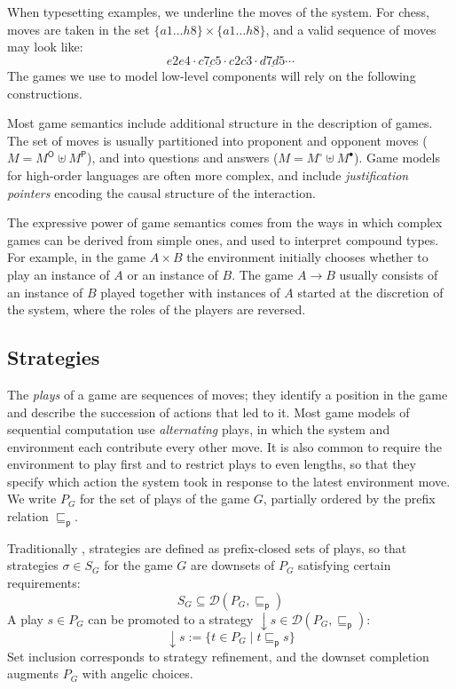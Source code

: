 \documentclass[draft,11pt]{report}
\theoremstyle{definition}
\newcommand{\kw}[1]{\ensuremath{ \mathsf{#1} }}
\newcommand{\que}{\circ}         %
\newcommand{\ans}{\bullet}       %
\newcommand{\pref}{\sqsubseteq_\kw{p}}  %
\begin{document}
When typesetting examples,
we underline the moves of the system.
For chess,
moves are taken in the set $\{a1 \ldots h8\} \times \{a1 \ldots h8\}$,
and a valid sequence of moves may look like:
\[ e2e4 \cdot \underline{c7c5} \cdot c2c3 \cdot \underline{d7d5} \cdots \]
The games we use to model low-level components
will rely on the following constructions.

Most game semantics
include additional structure
in the description of games.
The set of moves is usually partitioned
into proponent and opponent moves ($M = M^\kw{O} \uplus M^\kw{P}$),
and into questions and answers ($M = M^\que \uplus M^\ans$).
Game models for high-order languages are often more complex,
and include \emph{justification pointers}
encoding the causal structure of the interaction.

The expressive power of game semantics
comes from the ways in which complex games can be derived from simple ones,
and used to interpret compound types.
For example,
in the game $A \times B$
the environment initially chooses whether to play
an instance of $A$ or an instance of $B$.
The game $A \rightarrow B$ usually consists of
an instance of $B$ played
together with instances of $A$
started at the discretion of the system,
where the roles of the players are reversed.


\subsection{Strategies} %

The \emph{plays} of a game are sequences of moves;
they identify a position in the game
and describe the succession of actions that led to it.
Most game models of sequential computation
use \emph{alternating} plays,
in which
the system and environment each contribute
every other move.
It is also common to require the environment to play first
and to restrict plays to even lengths,
so that they specify which action the system took
in response to the latest environment move.
We write $P_G$ for the set of plays of the game $G$,
partially ordered by the prefix relation $\pref$.

Traditionally \citep{gamesem99},
strategies are defined as
prefix-closed sets of plays,
so that strategies $\sigma \in S_G$
for the game $G$ are downsets of $P_G$
satisfying certain requirements:
\[
    S_G \subseteq
    \mathcal{D}(P_G, {\pref})
\]
A play $s \in P_G$ can be promoted to a strategy
${\downarrow} s \in \mathcal{D}(P_G, {\pref})$:
\[
    {\downarrow} s := \{ t \in P_G \mid t \pref s \}
\]
Set inclusion corresponds to strategy refinement, %
and the downset completion augments $P_G$ with
angelic choices.
\end{document}
